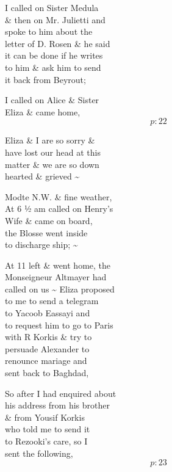 \documentclass{report}
\begin{document}
	\par{
 	I called on Sister Medula\ \\\& then on Mr. Julietti and\ \\spoke to him about the\ \\letter of D. Rosen \& he said\ \\it can be done if he writes\ \\to him \& ask him to send\ \\it back from Beyrout;\ \\
	}

	\par{
 	I called on Alice \& Sister\ \\Eliza \& came home,\ \\
  \[p: 22 \]

	}

	\par{
 	Eliza \& I are so sorry \&\ \\have lost our head at this\ \\matter \& we are so down\ \\hearted \& grieved \~{}\ \\
	}

	\par{
 	Modte N.W. \& fine weather,\ \\At 6 ½ am called on Henry’s\ \\Wife \& came on board,\ \\the Blosse went inside\ \\to discharge ship; \~{}\ \\
	}

	\par{
 	At 11 left \& went home, the\ \\Monseigneur Altmayer had\ \\called on us \~{} Eliza proposed\ \\to me to send a telegram\ \\to Yacoob Eassayi and\ \\to request him to go to Paris\ \\with R Korkis \& try to\ \\persuade Alexander to\ \\renounce mariage and\ \\sent back to Baghdad,\ \\
	}

	\par{
 	So after I had enquired about\ \\his address from his brother\ \\\& from Yousif Korkis\ \\who told me to send it\ \\to Rezooki’s care, so I\ \\sent the following,\ \\
  \[p: 23 \]

	}
\end{document}
